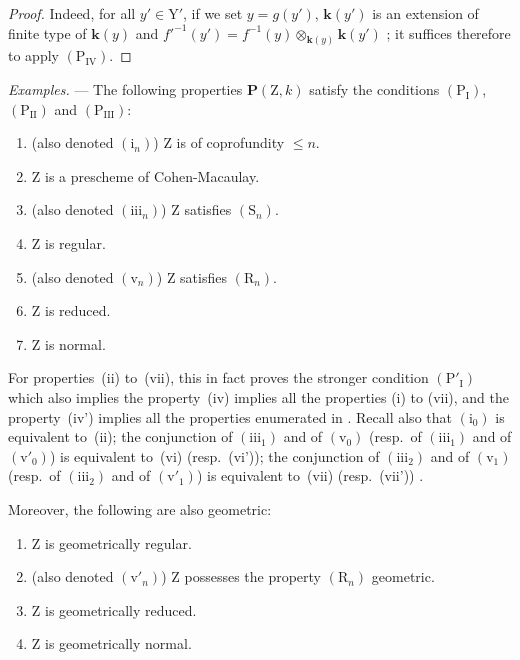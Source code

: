 \begin{proof}
Indeed, for all $y'\in\mathrm{Y}'$, if we set $y=g(y')$, $\boldsymbol{k}(y')$ is an extension of finite type of $\boldsymbol{k}(y)$  and $f'^{-1}(y')=f^{-1}(y)\otimes_{\boldsymbol{k}(y)}\boldsymbol{k}(y')$ ; it suffices therefore to apply $(\mathrm{P_{IV}})$.
\end{proof}


\begin{env}[7.3.8]
\label{IV.7.3.8}
\emph{Examples.} ---
The following properties $\boldsymbol{P}(\mathrm{Z},k)$ satisfy the conditions $(\mathrm{P_I})$, $(\mathrm{P_{II}})$ and $(\mathrm{P_{III}})$:
\begin{enumerate}[label=(\roman*)]
  \item (also denoted $(\mathrm{i}_n)$) $\mathrm{Z}$ is of coprofundity $\leqslant n$.
  \item $\mathrm{Z}$ is a prescheme of Cohen-Macaulay.
  \item (also denoted $(\mathrm{iii}_n)$) $\mathrm{Z}$ satisfies $(\mathrm{S}_n)$.
  \item $\mathrm{Z}$ is regular.
  \item (also denoted $(\mathrm{v}_n)$) $\mathrm{Z}$ satisfies $(\mathrm{R}_n)$.
  \item $\mathrm{Z}$ is reduced.
  \item $\mathrm{Z}$ is normal.
\end{enumerate}
For properties~(ii) to~(vii), this in fact proves the stronger condition $(\mathrm{P}'_\mathrm{I})$ which also implies the property~(iv) implies all the properties (i) to (vii), and the property~(iv') implies all the properties enumerated in .
Recall also that $(\mathrm{i}_0)$ is equivalent to~(ii); the conjunction of $(\mathrm{iii}_1)$ and of $(\mathrm{v}_0)$ (resp.~of $(\mathrm{iii}_1)$ and of $(\mathrm{v}'_0)$) is equivalent to~(vi) (resp.~(vi')); the conjunction of $(\mathrm{iii}_2)$ and of $(\mathrm{v}_1)$ (resp.~of $(\mathrm{iii}_2)$ and of $(\mathrm{v}'_1)$) is equivalent to~(vii) (resp.~(vii')) .

Moreover, the following are also geometric:
\begin{enumerate}[label=(\roman*')]
  \item[(iv')] $\mathrm{Z}$ is geometrically regular.
  \item[(v')] (also denoted $(\mathrm{v}'_n)$) $\mathrm{Z}$ possesses the property $(\mathrm{R}_n)$ geometric.
  \item[(vi')] $\mathrm{Z}$ is geometrically reduced.
  \item[(vii')] $\mathrm{Z}$ is geometrically normal.
\end{enumerate}
\end{env}


